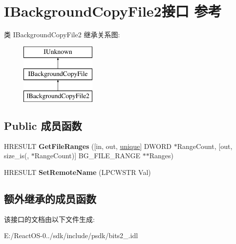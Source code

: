 \hypertarget{interface_i_background_copy_file2}{}\section{I\+Background\+Copy\+File2接口 参考}
\label{interface_i_background_copy_file2}
类 I\+Background\+Copy\+File2 继承关系图\+:\begin{figure}[H]
\begin{center}
\leavevmode
\includegraphics[height=3.000000cm]{interface_i_background_copy_file2}
\end{center}
\end{figure}
\subsection*{Public 成员函数}
\begin{DoxyCompactItemize}
\item 
\mbox{\label{interface_i_background_copy_file2_aa7dbe2aa40a4ed1876ba95430da44b4f}} 
H\+R\+E\+S\+U\+LT {\bfseries Get\+File\+Ranges} (\mbox{[}in, out, \hyperlink{interfaceunique}{unique}\mbox{]} D\+W\+O\+RD $\ast$Range\+Count, \mbox{[}out, size\+\_\+is(, $\ast$Range\+Count)\mbox{]} B\+G\+\_\+\+F\+I\+L\+E\+\_\+\+R\+A\+N\+GE $\ast$$\ast$Ranges)
\item 
\mbox{\label{interface_i_background_copy_file2_a2f6a9554286c18ae4fc19cd5a9fc8ece}} 
H\+R\+E\+S\+U\+LT {\bfseries Set\+Remote\+Name} (L\+P\+C\+W\+S\+TR Val)
\end{DoxyCompactItemize}
\subsection*{额外继承的成员函数}


该接口的文档由以下文件生成\+:\begin{DoxyCompactItemize}
\item 
E\+:/\+React\+O\+S-\/0../sdk/include/psdk/bits2\+\_.\+idl\end{DoxyCompactItemize}
